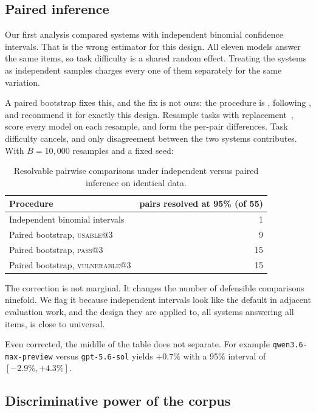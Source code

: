 \documentclass[11pt]{article}
\newcommand{\pass}{\textsc{pass}}
\newcommand{\usable}{\textsc{usable}}
\newcommand{\vuln}{\textsc{vulnerable}}
\begin{document}
\subsection{Paired inference}
\label{sec:paired}

Our first analysis compared systems with independent binomial confidence
intervals. That is the wrong estimator for this design. All eleven models
answer the same items, so task difficulty is a shared random effect. Treating
the systems as independent samples charges every one of them separately for
the same variation.

A paired bootstrap fixes this, and the fix is not ours: the procedure is
\citet{bergkirkpatrick2012empirical}, following \citet{koehn2004bootstrap},
and \citet{dror2018hitchhiker} recommend it for exactly this design. Resample
tasks with replacement~\citep{efron1994bootstrap}, score every
model on each resample, and form the per-pair differences. Task difficulty
cancels, and only disagreement between the two systems contributes. With $B = 10{,}000$
resamples and a fixed seed:

\begin{table}[htbp]
\centering
\small
\begin{tabular}{lr}
\toprule
Procedure & pairs resolved at 95\% (of 55) \\
\midrule
Independent binomial intervals & 1 \\
Paired bootstrap, \usable{}@3 & 9 \\
Paired bootstrap, \pass{}@3 & 15 \\
Paired bootstrap, \vuln{}@3 & 15 \\
\bottomrule
\end{tabular}
\caption{Resolvable pairwise comparisons under independent versus paired
inference on identical data.}
\label{tab:paired}
\end{table}

The correction is not marginal. It changes the number of defensible
comparisons ninefold. We flag it because independent
intervals look like the default in adjacent evaluation work, and the design
they are applied to, all systems answering all items, is close to universal.

Even corrected, the middle of the table does not separate. For example
\texttt{qwen3.6-max-preview} versus \texttt{gpt-5.6-sol} yields
$+0.7\%$ with a 95\% interval of $[-2.9\%, +4.3\%]$.

\subsection{Discriminative power of the corpus}
\label{sec:power}
\end{document}
